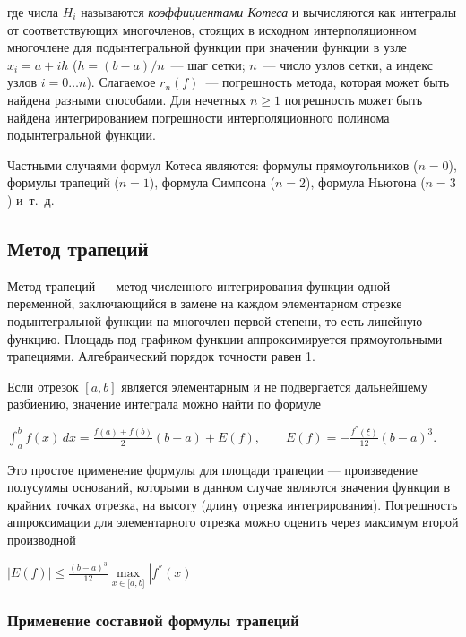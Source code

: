 \documentclass[a4paper]{article}
\begin{document}
{{{{{{{{где числа {{\(H_{i}\)}} называются \emph{коэффициентами Котеса} и
вычисляются как интегралы от соответствующих многочленов, стоящих в
исходном интерполяционном многочлене для подынтегральной функции при
значении функции в узле {{\(x_{i} = a + ih\)}}
({{\(h = (b - a)/n\)}}~--- шаг сетки; {{\(n\)}}~--- число узлов сетки, а
индекс узлов {{\(i = 0\ldots n\)}}). Слагаемое {{\(r_{n}(f)\)}}~---
погрешность метода, которая может быть найдена разными способами. Для
нечетных {{\(n \geqslant 1\)}} погрешность может быть найдена
интегрированием погрешности интерполяционного полинома подынтегральной
функции.

Частными случаями формул Котеса являются: формулы прямоугольников
({{\(n = 0\)}}), формулы трапеций ({{\(n = 1\)}}), формула Симпсона
({{\(n = 2\)}}), формула Ньютона ({{\(n = 3\)}}) и~т.~д.

\subsection{Метод трапеций}

Метод трапеций — метод численного интегрирования функции одной переменной, заключающийся в замене на каждом элементарном отрезке подынтегральной функции на многочлен первой степени, то есть линейную функцию. Площадь под графиком функции аппроксимируется прямоугольными трапециями. Алгебраический порядок точности равен 1.

Если отрезок {{\(\left\lbrack {a,b} \right\rbrack\)}} является
элементарным и не подвергается дальнейшему разбиению, значение интеграла
можно найти по формуле

\begin{center}
 {{\(\int_{a}^{b}f(x)\, dx = \frac{f(a) + f(b)}{2}(b - a) + E(f),\qquad E(f) = - \frac{f^{''}(\xi)}{12}\left( {b - a} \right)^{3}.\)}}
\end{center}

Это простое применение формулы для площади трапеции --- произведение
полусуммы оснований, которыми в данном случае являются значения функции
в крайних точках отрезка, на высоту (длину отрезка интегрирования).
Погрешность аппроксимации для элементарного отрезка можно оценить через
максимум второй производной

\begin{center}
 {{\(\left| {E(f)} \right| \leqslant \frac{\left( {b - a} \right)^{3}}{12}\max\limits_{x \in \lbrack a,b\rbrack}\left| {f^{''}(x)} \right|\)}}
\end{center}

\subsubsection{Применение составной формулы трапеций}

}}}}}}}}
\end{document}
